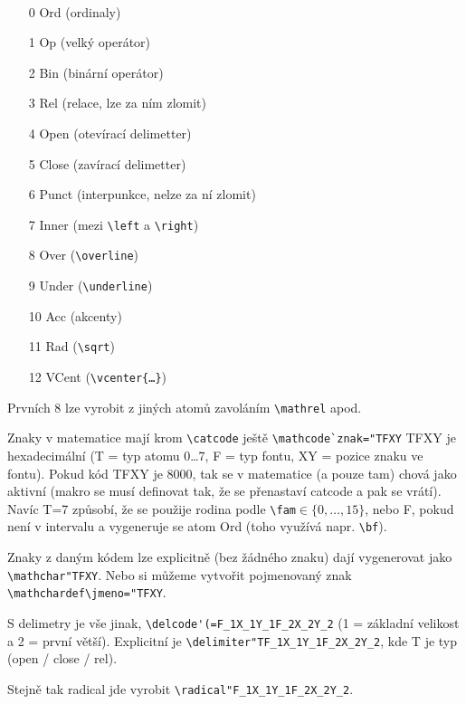 \documentclass[12pt]{article}					%
\begin{document}
    \begin{definice}[Atomy]
        \ 
        \begin{itemize}
            \item[0] Ord (ordinaly)
            \item[1] Op (velký operátor)
            \item[2] Bin (binární operátor)
            \item[3] Rel (relace, lze za ním zlomit)
            \item[4] Open (otevírací delimetter)
            \item[5] Close (zavírací delimetter)
            \item[6] Punct (interpunkce, nelze za ní zlomit)
            \item[7] Inner (mezi \verb|\left| a \verb|\right|)
            \item[8] Over (\verb|\overline|)
            \item[9] Under (\verb|\underline|)
            \item[10] Acc (akcenty)
            \item[11] Rad (\verb|\sqrt|)
            \item[12] VCent (\verb|\vcenter{…}|)
        \end{itemize}

        Prvních 8 lze vyrobit z jiných atomů zavoláním \verb|\mathrel| apod.

        Znaky v matematice mají krom \verb|\catcode| ještě \verb|\mathcode`znak="TFXY| TFXY je hexadecimální (T = typ atomu 0…7, F = typ fontu, XY = pozice znaku ve fontu). Pokud kód TFXY je 8000, tak se v matematice (a pouze tam) chová jako aktivní (makro se musí definovat tak, že se přenastaví catcode a pak se vrátí). Navíc T=7 způsobí, že se použije rodina podle \verb|\fam|$\in \{0, …, 15\}$, nebo F, pokud není v intervalu a vygeneruje se atom Ord (toho využívá napr. \verb|\bf|).

        Znaky z daným kódem lze explicitně (bez žádného znaku) dají vygenerovat jako \verb|\mathchar"TFXY|. Nebo si můžeme vytvořit pojmenovaný znak \verb|\mathchardef\jmeno="TFXY|.

        S delimetry je vše jinak, \verb|\delcode'(=F_1X_1Y_1F_2X_2Y_2| (1 = základní velikost a 2 = první větší). Explicitní je \verb|\delimiter"TF_1X_1Y_1F_2X_2Y_2|, kde T je typ (open / close / rel).

        Stejně tak radical jde vyrobit \verb|\radical"F_1X_1Y_1F_2X_2Y_2|.
    \end{definice}
\end{document}
